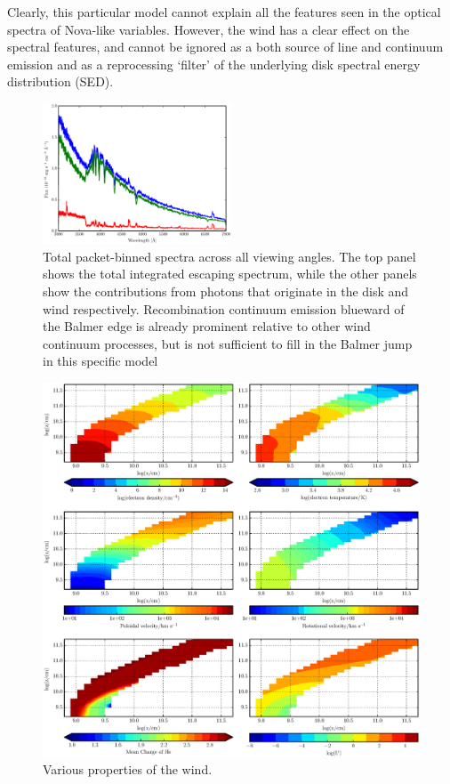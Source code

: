 \documentclass[preprint, a4paper, 11pt]{aastex}
\begin{document}
Clearly, this particular model cannot explain all
the features seen in the optical spectra of Nova-like variables. However,
the wind has a clear effect on the spectral features, and cannot be ignored as 
a both source of line and continuum emission and as a reprocessing `filter'
of the underlying disk spectral energy distribution (SED).



\begin{figure} 
\includegraphics[width=0.5\textwidth]{figures/fig4.eps}
\caption{Total packet-binned spectra across all viewing angles. The top panel shows the total 
integrated escaping spectrum, while the other panels show the contributions from photons that originate
in the disk and wind respectively. Recombination continuum emission blueward of the Balmer 
edge is already prominent relative to other wind continuum processes, but is not sufficient
to fill in the Balmer jump in this specific model}
\label{cont}
\end{figure} 





\begin{figure} %
\includegraphics[width=\textwidth]{figures/fig5.eps}
\caption{Various properties of the wind.}
\label{wind}
\end{figure} %
\end{document}
